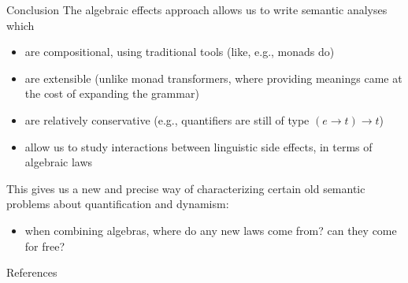 \documentclass[presentation]{beamer}
\def\ra{\rightarrow}
\begin{document}
\begin{frame}[label={sec:org9166a4e}]{Conclusion}
The algebraic effects approach allows us to write semantic analyses which
\pause
\begin{itemize}[<+->]
\item are compositional, using traditional tools (like, e.g., monads do)
\item are extensible (unlike monad transformers, where providing meanings came at the cost of expanding the grammar)
\item are relatively conservative (e.g., quantifiers are still of type \((e \ra t) \ra t\))
\item allow us to study interactions between linguistic side effects, in terms of algebraic laws
\end{itemize}

\bigskip \pause
This gives us a new and precise way of characterizing certain old semantic problems about quantification and dynamism:
\pause
\begin{itemize}[<+->]
\item when combining algebras, where do any new laws come from? can they come for free?
\end{itemize}
\end{frame}



\begin{frame}[allowframebreaks]{References}

\end{frame}
\end{document}
